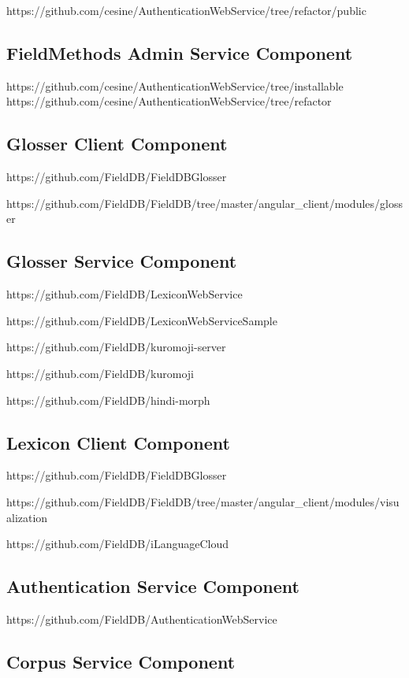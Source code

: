 \documentclass[12pt]{article}
\begin{document}
https://github.com/cesine/AuthenticationWebService/tree/refactor/public

\subsection{FieldMethods Admin Service Component}

https://github.com/cesine/AuthenticationWebService/tree/installable
https://github.com/cesine/AuthenticationWebService/tree/refactor

\subsection{Glosser Client Component}

https://github.com/FieldDB/FieldDBGlosser

https://github.com/FieldDB/FieldDB/tree/master/angular\_client/modules/glosser

\subsection{Glosser Service Component}

https://github.com/FieldDB/LexiconWebService

https://github.com/FieldDB/LexiconWebServiceSample


https://github.com/FieldDB/kuromoji-server

https://github.com/FieldDB/kuromoji

https://github.com/FieldDB/hindi-morph

\subsection{Lexicon Client Component}

https://github.com/FieldDB/FieldDBGlosser

https://github.com/FieldDB/FieldDB/tree/master/angular\_client/modules/visualization

https://github.com/FieldDB/iLanguageCloud

\subsection{Authentication Service Component}

https://github.com/FieldDB/AuthenticationWebService


\subsection{Corpus Service Component}
\end{document}
